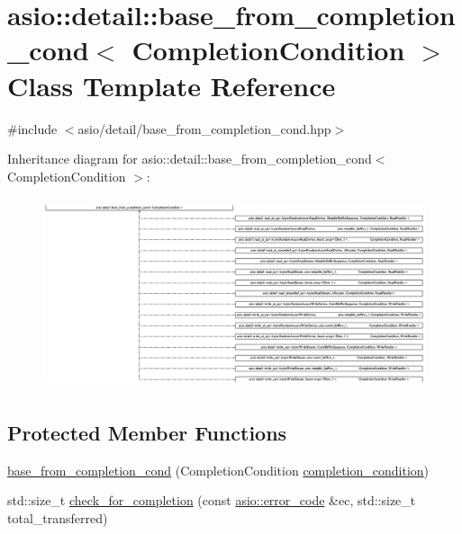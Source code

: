 \hypertarget{classasio_1_1detail_1_1base__from__completion__cond}{}\section{asio\+:\+:detail\+:\+:base\+\_\+from\+\_\+completion\+\_\+cond$<$ Completion\+Condition $>$ Class Template Reference}
\label{classasio_1_1detail_1_1base__from__completion__cond}


{\ttfamily \#include $<$asio/detail/base\+\_\+from\+\_\+completion\+\_\+cond.\+hpp$>$}

Inheritance diagram for asio\+:\+:detail\+:\+:base\+\_\+from\+\_\+completion\+\_\+cond$<$ Completion\+Condition $>$\+:\begin{figure}[H]
\begin{center}
\leavevmode
\includegraphics[height=5.626477cm]{classasio_1_1detail_1_1base__from__completion__cond}
\end{center}
\end{figure}
\subsection*{Protected Member Functions}
\begin{DoxyCompactItemize}
\item 
\hyperlink{classasio_1_1detail_1_1base__from__completion__cond_ac07a2476dddb8b98f2852553e32c9d75}{base\+\_\+from\+\_\+completion\+\_\+cond} (Completion\+Condition \hyperlink{group__async__read_gae2e215d5013596cc2b385bb6c13fa518}{completion\+\_\+condition})
\item 
std\+::size\+\_\+t \hyperlink{classasio_1_1detail_1_1base__from__completion__cond_ac1e557edd956367409f816cbca2c76f0}{check\+\_\+for\+\_\+completion} (const \hyperlink{classasio_1_1error__code}{asio\+::error\+\_\+code} \&ec, std\+::size\+\_\+t total\+\_\+transferred)
\end{DoxyCompactItemize}


